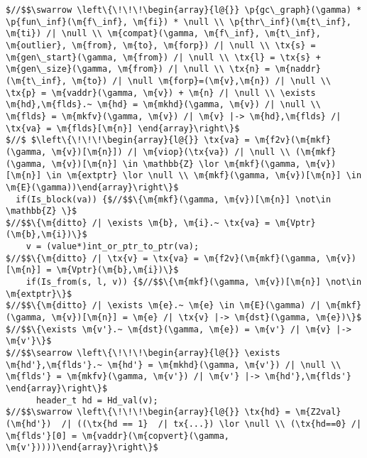 \begin{figure*}[!ht]
\begin{lstlisting}[multicols=2]
$//$$\swarrow \left\{\!\!\!\begin{array}{l@{}} \p{gc\_graph}(\gamma) * \p{fun\_inf}(\m{f\_inf}, \m{fi}) * \null \\ \p{thr\_inf}(\m{t\_inf}, \m{ti}) /| \null \\ \m{compat}(\gamma, \m{f\_inf}, \m{t\_inf}, \m{outlier}, \m{from}, \m{to}, \m{forp}) /| \null \\ \tx{s} = \m{gen\_start}(\gamma, \m{from}) /| \null \\ \tx{l} = \tx{s} + \m{gen\_size}(\gamma, \m{from}) /| \null \\ \tx{n} = \m{naddr}(\m{t\_inf}, \m{to}) /| \null \m{forp}=(\m{v},\m{n}) /| \null \\ \tx{p} = \m{vaddr}(\gamma, \m{v}) + \m{n} /| \null \\ \exists \m{hd},\m{flds}.~ \m{hd} = \m{mkhd}(\gamma, \m{v}) /| \null \\ \m{flds} = \m{mkfv}(\gamma, \m{v}) /| \m{v} |-> \m{hd},\m{flds} /| \tx{va} = \m{flds}[\m{n}] \end{array}\right\}$
$//$ $\left\{\!\!\!\begin{array}{l@{}} \tx{va} = \m{f2v}(\m{mkf}(\gamma, \m{v})[\m{n}]) /| \m{viop}(\tx{va}) /| \null \\ (\m{mkf}(\gamma, \m{v})[\m{n}] \in \mathbb{Z} \lor \m{mkf}(\gamma, \m{v})[\m{n}] \in \m{extptr} \lor \null \\ \m{mkf}(\gamma, \m{v})[\m{n}] \in \m{E}(\gamma))\end{array}\right\}$
  if(Is_block(va)) {$//$$\{\m{mkf}(\gamma, \m{v})[\m{n}] \not\in \mathbb{Z} \}$
$//$$\{\m{ditto} /| \exists \m{b}, \m{i}.~ \tx{va} = \m{Vptr}(\m{b},\m{i})\}$
    v = (value*)int_or_ptr_to_ptr(va); 
$//$$\{\m{ditto} /| \tx{v} = \tx{va} = \m{f2v}(\m{mkf}(\gamma, \m{v})[\m{n}] = \m{Vptr}(\m{b},\m{i})\}$
    if(Is_from(s, l, v)) {$//$$\{\m{mkf}(\gamma, \m{v})[\m{n}] \not\in \m{extptr}\}$
$//$$\{\m{ditto} /| \exists \m{e}.~ \m{e} \in \m{E}(\gamma) /| \m{mkf}(\gamma, \m{v})[\m{n}] = \m{e} /| \tx{v} |-> \m{dst}(\gamma, \m{e})\}$
$//$$\{\exists \m{v'}.~ \m{dst}(\gamma, \m{e}) = \m{v'} /| \m{v} |-> \m{v'}\}$
$//$$\searrow \left\{\!\!\!\begin{array}{l@{}} \exists \m{hd'},\m{flds'}.~ \m{hd'} = \m{mkhd}(\gamma, \m{v'}) /| \null \\ \m{flds'} = \m{mkfv}(\gamma, \m{v'}) /| \m{v'} |-> \m{hd'},\m{flds'} \end{array}\right\}$
      header_t hd = Hd_val(v);
$//$$\swarrow \left\{\!\!\!\begin{array}{l@{}} \tx{hd} = \m{Z2val}(\m{hd'})  /| ((\tx{hd == 1}  /| tx{...}) \lor \null \\ (\tx{hd==0} /| \m{flds'}[0] = \m{vaddr}(\m{copvert}(\gamma, \m{v'}))))\end{array}\right\}$

\end{lstlisting}
\end{figure*}
